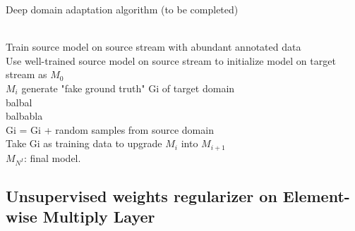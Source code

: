 \documentclass[runningheads]{llncs}
\begin{document}
\begin{algorithm}
\caption{Deep domain adaptation algorithm (to be completed)}
\label{algorithm:Deep domain adaptation algorithm (to be completed)}
\begin{algorithmic}[1]
 {} \\
\indent Train source model on source stream with abundant annotated data \\
\indent Use well-trained source model on source stream to initialize model on target stream as $M_{0}$
 \\
\indent \indent $M_{i}$ generate "fake ground truth" Gi of target domain \\
\indent \indent balbal \\
\indent \indent balbabla \\
\indent \indent Gi = Gi + random samples from source domain \\
\indent \indent Take Gi as training data to upgrade $M_{i}$ into $M_{i+1}$
\EndFor \\
\indent $M_{N^{I}}$: final model.
\EndProcedure
\end{algorithmic}
\end{algorithm}


\subsection{Unsupervised weights regularizer on Element-wise Multiply Layer}
\end{document}
